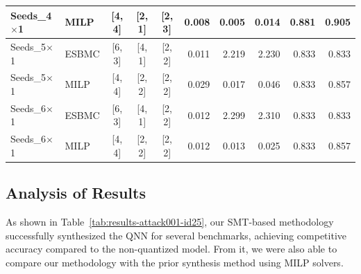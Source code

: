\begin{table}[htbp]
\begin{tabular}{@{}llccc rrr rr@{}}
Seeds\_4$\times$1 & MILP & {[4, 4]} & {[2, 1]} & {[2, 3]} & 0.008 & 0.005 & 0.014 & 0.881 & 0.905 \\
\hline
Seeds\_5$\times$1 & ESBMC & {[6, 3]} & {[4, 1]} & {[2, 2]} & 0.011 & 2.219 & 2.230 & 0.833 & 0.833 \\
Seeds\_5$\times$1 & MILP & {[4, 4]} & {[2, 2]} & {[2, 2]} & 0.029 & 0.017 & 0.046 & 0.833 & 0.857 \\
\hline
Seeds\_6$\times$1 & ESBMC & {[6, 3]} & {[4, 1]} & {[2, 2]} & 0.012 & 2.299 & 2.310 & 0.833 & 0.833 \\
Seeds\_6$\times$1 & MILP & {[4, 4]} & {[2, 2]} & {[2, 2]} & 0.012 & 0.013 & 0.025 & 0.833 & 0.857 \\
\hline
\end{tabular}
\end{table}

\subsection{Analysis of Results}


As shown in Table~\ref{tab:results-attack001-id25}, our SMT-based methodology successfully synthesized the QNN for several benchmarks, achieving competitive accuracy compared to the non-quantized model. From it, we were also able to compare our methodology with the prior synthesis method using MILP solvers.


